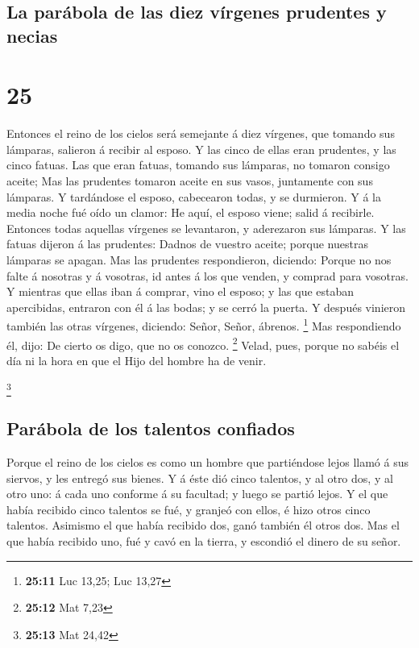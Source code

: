 \hypertarget{la-paruxe1bola-de-las-diez-vuxedrgenes-prudentes-y-necias}{%
\subsection{La parábola de las diez vírgenes prudentes y
necias}\label{la-paruxe1bola-de-las-diez-vuxedrgenes-prudentes-y-necias}}

\hypertarget{section-24}{%
\section{25}\label{section-24}}

 Entonces el reino de los cielos será semejante á diez
vírgenes, que tomando sus lámparas, salieron á recibir al esposo.
 Y las cinco de ellas eran prudentes, y las cinco fatuas.
 Las que eran fatuas, tomando sus lámparas, no tomaron
consigo aceite;  Mas las prudentes tomaron aceite en sus
vasos, juntamente con sus lámparas.  Y tardándose el
esposo, cabecearon todas, y se durmieron.  Y á la media
noche fué oído un clamor: He aquí, el esposo viene; salid á recibirle.
 Entonces todas aquellas vírgenes se levantaron, y
aderezaron sus lámparas.  Y las fatuas dijeron á las
prudentes: Dadnos de vuestro aceite; porque nuestras lámparas se apagan.
 Mas las prudentes respondieron, diciendo: Porque no nos
falte á nosotras y á vosotras, id antes á los que venden, y comprad para
vosotras.  Y mientras que ellas iban á comprar, vino el
esposo; y las que estaban apercibidas, entraron con él á las bodas; y se
cerró la puerta.  Y después vinieron también las otras
vírgenes, diciendo: Señor, Señor, ábrenos. \footnote{\textbf{25:11} Luc
  13,25; Luc 13,27}  Mas respondiendo él, dijo: De cierto
os digo, que no os conozco. \footnote{\textbf{25:12} Mat 7,23}
 Velad, pues, porque no sabéis el día ni la hora en que
el Hijo del hombre ha de venir.

\footnote{\textbf{25:13} Mat 24,42}

\hypertarget{paruxe1bola-de-los-talentos-confiados}{%
\subsection{Parábola de los talentos
confiados}\label{paruxe1bola-de-los-talentos-confiados}}

 Porque el reino de los cielos es como un hombre que
partiéndose lejos llamó á sus siervos, y les entregó sus bienes.
 Y á éste dió cinco talentos, y al otro dos, y al otro
uno: á cada uno conforme á su facultad; y luego se partió lejos.
 Y el que había recibido cinco talentos se fué, y granjeó
con ellos, é hizo otros cinco talentos.  Asimismo el que
había recibido dos, ganó también él otros dos.  Mas el
que había recibido uno, fué y cavó en la tierra, y escondió el dinero de
su señor.

